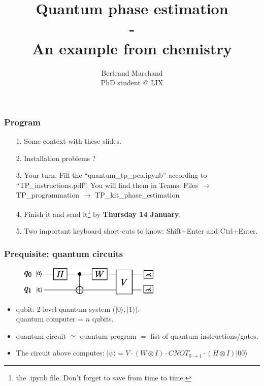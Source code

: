 \documentclass{beamer}
\title{Quantum phase estimation \\-\\ An example from chemistry}
\author{Bertrand Marchand \\PhD student @ LIX}
\begin{document}
\frame{\titlepage}

\begin{frame}
\frametitle{Program}

\begin{itemize}
\item[1.] Some context with these slides.
\item[2.] Installation problems ?
\item[3.] Your turn. Fill the ``quantum\_tp\_pea.ipynb'' according to ``TP\_instructions.pdf''. You will find them in Teams: Files $\rightarrow$ 
TP\_programmation $\rightarrow$ TP\_kit\_phase\_estimation 
\item[4.] Finish it and send it\footnote{the .ipynb file. Don't forget to save from time to time.} 
by \textbf{Thursday 14 January}.
\item[5.] Two important keyboard short-cuts to know: Shift+Enter and Ctrl+Enter.
\end{itemize}

\end{frame}

\begin{frame}
\frametitle{Prequisite: quantum circuits}

\begin{center}
\begin{figure}
\includegraphics[width=0.6\textwidth]{quantum_circuit_example.eps}
\end{figure}
\end{center}
\begin{itemize}
\item qubit: 2-level quantum system ($|0\rangle, |1\rangle$). \\ quantum computer = $n$ qubits.
\item quantum circuit $\simeq$ quantum program $=$ list of quantum instructions/gates.
\item The circuit above computes: $|\psi\rangle = V \cdot (W\otimes I) \cdot CNOT_{0\rightarrow 1} \cdot (H\otimes I) |00\rangle$
\end{itemize}

 
\end{frame}
\end{document}
